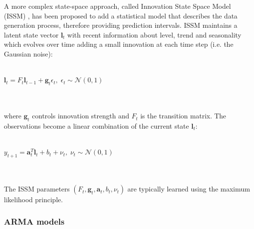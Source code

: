 \documentclass[a4paper, 12pt]{article} %
\begin{document}
	A more complex state-space approach, called Innovation State Space Model (ISSM) \cite{ExponentialSmoothingStateSpace}, has been proposed to add a statistical model that describes the data generation process, therefore providing prediction intervals. ISSM maintains a latent state vector $\pmb{l}_t$ with recent information about level, trend and seasonality which evolves over time adding a small innovation at each time step (i.e. the Gaussian noise):\\\\
	\centerline{
	$
	\pmb{l}_t = F_t \pmb{l}_{t-1} + \pmb{g}_t \epsilon_t,\; \epsilon_t \sim \mathcal{N}(0,1)
	$
	}\\\\
	where $\pmb{g}_t$ controls innovation strength and $F_t$ is the transition matrix. 
	The observations become a linear combination of the current state $\pmb{l}_t$:\\\\
	\centerline{$
	y_{t+1} = \pmb{a}_{t}^T \pmb{l}_t + b_{t} + \nu_t,\; \nu_t \sim \mathcal{N}(0,1)
	$}\\\\
	The ISSM parameters $(F_t, \pmb{g}_t, \pmb{a}_t, b_t, \nu_t)$ are typically learned using the maximum likelihood principle.
	
	\subsubsection{ARMA models} \label{sssec:arma}
	
\end{document}
